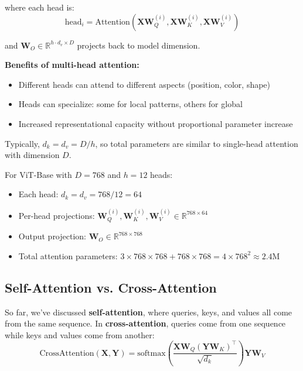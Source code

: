 where each head is:
\begin{equation}
\text{head}_i = \text{Attention}(\mathbf{X}\mathbf{W}_Q^{(i)}, \mathbf{X}\mathbf{W}_K^{(i)}, \mathbf{X}\mathbf{W}_V^{(i)})
\label{eq:attention_head}
\end{equation}

and $\mathbf{W}_O \in \mathbb{R}^{h \cdot d_v \times D}$ projects back to model dimension.

\textbf{Benefits of multi-head attention:}
\begin{itemize}
    \item Different heads can attend to different aspects (position, color, shape)
    \item Heads can specialize: some for local patterns, others for global
    \item Increased representational capacity without proportional parameter increase
\end{itemize}

Typically, $d_k = d_v = D / h$, so total parameters are similar to single-head attention with dimension $D$.

\begin{example}
For ViT-Base with $D = 768$ and $h = 12$ heads:
\begin{itemize}
    \item Each head: $d_k = d_v = 768 / 12 = 64$
    \item Per-head projections: $\mathbf{W}_Q^{(i)}, \mathbf{W}_K^{(i)}, \mathbf{W}_V^{(i)} \in \mathbb{R}^{768 \times 64}$
    \item Output projection: $\mathbf{W}_O \in \mathbb{R}^{768 \times 768}$
    \item Total attention parameters: $3 \times 768 \times 768 + 768 \times 768 = 4 \times 768^2 \approx 2.4$M
\end{itemize}
\end{example}

\subsection{Self-Attention vs. Cross-Attention}

So far, we've discussed \textbf{self-attention}, where queries, keys, and values all come from the same sequence. In \textbf{cross-attention}, queries come from one sequence while keys and values come from another:
\begin{equation}
\text{CrossAttention}(\mathbf{X}, \mathbf{Y}) = \text{softmax}\left(\frac{\mathbf{X}\mathbf{W}_Q (\mathbf{Y}\mathbf{W}_K)^\top}{\sqrt{d_k}}\right) \mathbf{Y}\mathbf{W}_V
\label{eq:cross_attention}
\end{equation}

